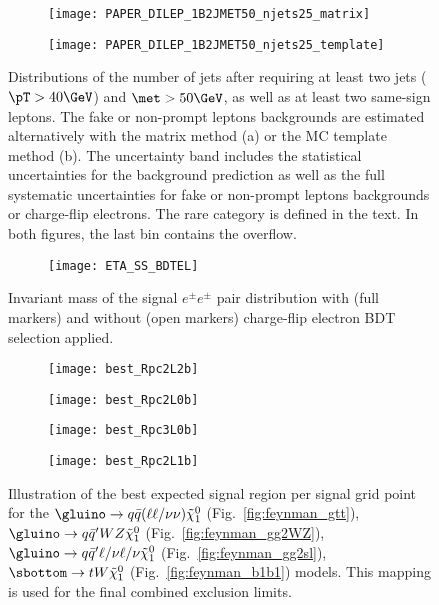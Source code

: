 

\begin{figure}[htb!]
\begin{subfigure}[t]{0.49\textwidth}\texttt{[image: PAPER\_DILEP\_1B2JMET50\_njets25\_matrix]}\caption{}\label{fig:VR1b2j_MxM}\end{subfigure}
\begin{subfigure}[t]{0.49\textwidth}\texttt{[image: PAPER\_DILEP\_1B2JMET50\_njets25\_template]}\caption{}\label{fig:VR1b2j_MCT}\end{subfigure}
\caption{
Distributions of the number of jets after requiring at least two jets ($\pT>40 \GeV$) and $\met>50 \GeV$, 
as well as at least two same-sign leptons. 
The fake or non-prompt leptons backgrounds are estimated alternatively with the matrix method (a) or the MC template method (b). 
The uncertainty band includes the statistical uncertainties for the background prediction as well as the
full systematic uncertainties for fake or non-prompt leptons backgrounds or charge-flip electrons. 
The rare category is defined in the text. In both figures, the last bin contains the overflow.
}
\label{fig:VR1b2j}
\end{figure}

\begin{figure}[htb!]
\centering
\begin{subfigure}[t]{0.66\textwidth}\texttt{[image: ETA\_SS\_BDTEL]}\end{subfigure}
\caption{Invariant mass of the signal $e^{\pm} e^{\pm}$ pair distribution with (full markers) and without (open markers) charge-flip electron BDT selection applied.
}
\label{fig:ETA_SS_BDTEL}
\end{figure}


\begin{figure}[htb!]
\centering
\begin{subfigure}[t]{0.49\textwidth}\texttt{[image: best\_Rpc2L2b]}\caption{}\label{fig:best_Rpc2L2b}\end{subfigure}
\begin{subfigure}[t]{0.49\textwidth}\texttt{[image: best\_Rpc2L0b]}\caption{}\label{fig:best_Rpc2L0b}\end{subfigure}
\begin{subfigure}[t]{0.49\textwidth}\texttt{[image: best\_Rpc3L0b]}\caption{}\label{fig:best_Rpc3L0b}\end{subfigure}
\begin{subfigure}[t]{0.49\textwidth}\texttt{[image: best\_Rpc2L1b]}\caption{}\label{fig:best_Rpc2L1b}\end{subfigure}
\caption{Illustration of the best expected signal region per signal grid point for the 
$\gluino\to q\bar q (\ell\ell/\nu\nu)\tilde\chi^0_1$ (Fig.~\ref{fig:feynman_gtt}), $\gluino\to q\bar q' WZ\tilde\chi^0_1$ (Fig.~\ref{fig:feynman_gg2WZ}),
$\gluino\to q\bar q' \ell/\nu \ell/\nu \tilde\chi^0_1$ (Fig.~\ref{fig:feynman_gg2sl}), $\sbottom\to t W \tilde\chi^0_1$ (Fig.~\ref{fig:feynman_b1b1}) models. 
This mapping is used for the final combined exclusion limits.}
\label{fig:best_SR}
\end{figure}


